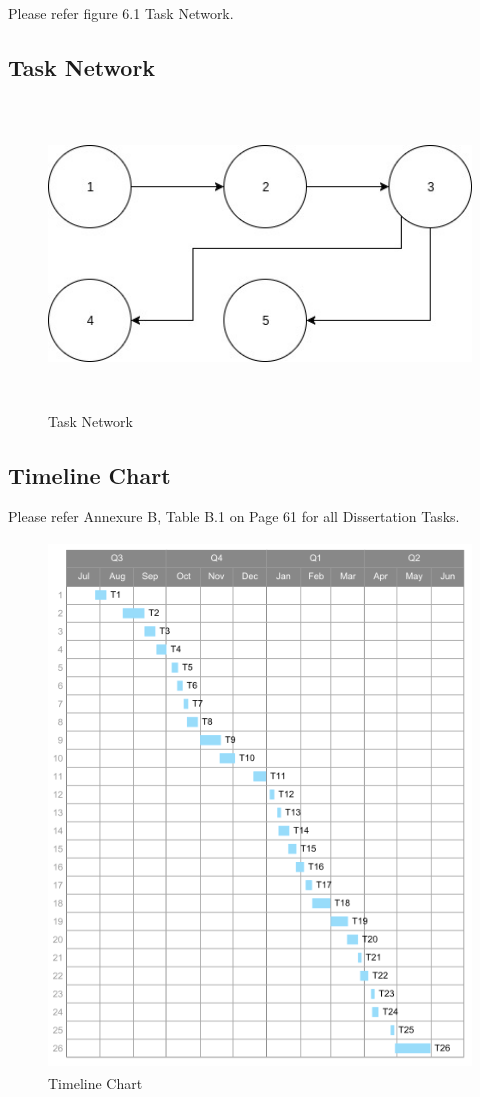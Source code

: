 \documentclass[oneside,a4paper,12pt]{pictreport}
\begin{document}
\par Please refer figure 6.1 Task Network.
\newpage
\subsection{Task Network}
\begin{figure}[!h]
\centering
\includegraphics[width=5.5in,height=3.2in]{task.jpg}
\caption{Task Network}
\end{figure}
\newpage
\subsection{Timeline Chart}
Please refer Annexure B, Table B.1 on Page 61 for all Dissertation Tasks.
\begin{figure}[!h]
\centering
\includegraphics[width=5.5in,height=5.5in]{timeline.png}
\caption{Timeline Chart}
\end{figure}
\end{document}
